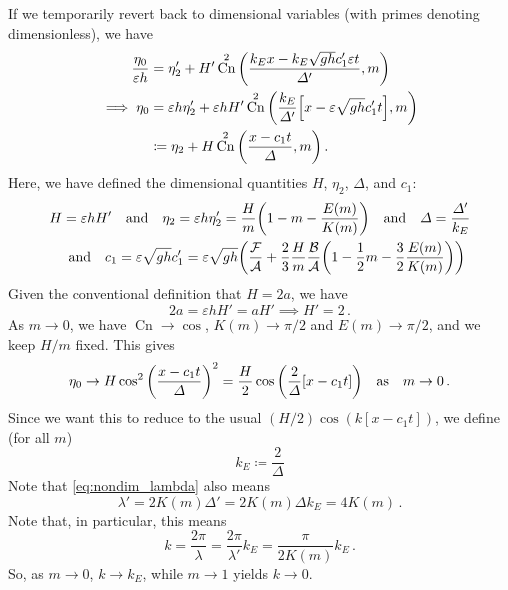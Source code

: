 \documentclass{jfm}
\DeclareMathOperator{\cn}{Cn}
\renewcommand*{\epsilon}{\varepsilon}
\begin{document}
If we temporarily revert back to dimensional variables (with primes
denoting dimensionless), we have
\begin{equation}
  \begin{split}
  \frac{\eta_0}{\epsilon h} &= \eta_2' + H' \cn^2\pqty{\frac{k_E x - k_E
    \sqrt{gh} c_1' \epsilon t}{\Delta'}, m}
  \\
  \implies
  \eta_0 &= \epsilon h \eta_2' + \epsilon h H'
  \cn^2\pqty{\frac{k_E}{\Delta'} \bqty{x - \epsilon \sqrt{gh} c_1' t}, m}
  \\
  &\coloneqq \eta_2 + H \cn^2\pqty{\frac{x - c_1 t}{\Delta}, m} \,.
  \end{split}
\end{equation}
Here, we have defined the dimensional quantities $H$, $\eta_2$,
$\Delta$, and $c_1$:
\begin{gather}
  H = \epsilon h H'
  \qq{and}
  \eta_2 = \epsilon h \eta_2' = \frac{H}{m} \pqty{1 - m - \frac{E(m)}{K(m)}}
  \qq{and}
  \Delta = \frac{\Delta'}{k_E}
  \\
  \qq{and}
  c_1 = \epsilon \sqrt{gh} c_1' = \epsilon \sqrt{gh} \pqty{
    \frac{\mathcal{F}}{\mathcal{A}} + \frac{2}{3} \frac{H}{m}
    \frac{\mathcal{B}}{\mathcal{A}} \pqty{1 - \frac{1}{2} m - \frac{3}{2}
    \frac{E(m)}{K(m)}} }
\end{gather}
Given the conventional definition that $H = 2 a$, we have
\begin{equation}
  2 a = \epsilon h H' = a H' \implies H' = 2 \,.
\end{equation}
As $m \to 0$, we have $\cn \to \cos$, $K(m) \to \pi/2$ and $E(m) \to
\pi/2$, and we keep $H/m$ fixed.
This gives
\begin{equation}
  \eta_0 \to H \cos^2 \pqty{\frac{x-c_1 t}{\Delta}}^2
  = \frac{H}{2} \cos \pqty{\frac{2}{\Delta} \bqty{x-c_1 t}}
  \qq{as} m \to 0 \,.
\end{equation}
Since we want this to reduce to the usual $(H/2) \cos(k[x-c_1 t])$, we
define (for all $m$)
\begin{equation}
  k_E \coloneqq \frac{2}{\Delta}
\end{equation}
Note that \cref{eq:nondim_lambda} also means
\begin{equation}
  \lambda' = 2 K(m) \Delta' = 2 K(m) \Delta k_E = 4 K(m) \,.
\end{equation}
Note that, in particular, this means
\begin{equation}
  k = \frac{2 \pi}{\lambda} = \frac{2 \pi}{\lambda'} k_E
  = \frac{\pi}{2 K(m)} k_E \,.
\end{equation}
So, as $m \to 0$, $k \to k_E$, while $m \to 1$ yields $k \to 0$.
\end{document}
